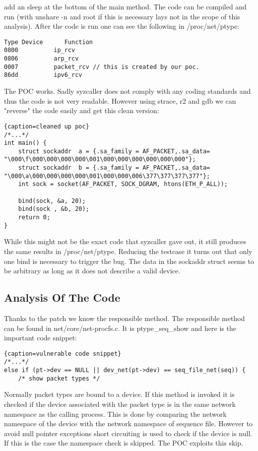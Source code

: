 \documentclass[10pt,twocolumn,a4paper]{article}
\begin{document}
add an sleep at the bottom of the main method. The code can be compiled and run (with unshare -n and root if this
is necessary lays not in the scope of this analysis). After the code is run one can see the following
in /proc/net/ptype:
\begin{lstlisting}
Type Device      Function
0800          ip_rcv
0806          arp_rcv
0007          packet_rcv // this is created by our poc.
86dd          ipv6_rcv
\end{lstlisting}
The POC works. Sadly syzcaller does not comply with any coding standards and thus the code is
not very readable. However using strace, r2\cite{29} and gdb\cite{28} we can "reverse" the code easily and get this
clean version:
\begin{lstlisting}{caption=cleaned up poc}
/*...*/
int main() {
    struct sockaddr  a = {.sa_family = AF_PACKET,.sa_data= "\000\f\000\000\000\000\001\000\000\000\000\000\000"};
    struct sockaddr  b = {.sa_family = AF_PACKET,.sa_data= "\000\a\000\000\000\000\001\000\000\006\377\377\377\377"};
    int sock = socket(AF_PACKET, SOCK_DGRAM, htons(ETH_P_ALL));

    bind(sock, &a, 20);
    bind(sock , &b, 20);
    return 0;
}
\end{lstlisting}
While this might not be the exact code that syzcaller gave out, it still
produces the same results in /proc/net/ptype. Reducing the testcase it turns out that only one bind is necessary to trigger the bug. The data in the sockaddr struct seems to be arbitrary
as long as it does not describe a valid device. 
\subsection{Analysis Of The Code}
Thanks to the patch we know the responsible method.
The responsible method can be found in net/core/net-procfs.c. It is ptype\_seq\_show
and here is the important code snippet:
\begin{lstlisting}{caption=vulnerable code snippet}
/*...*/
else if (pt->dev == NULL || dev_net(pt->dev) == seq_file_net(seq)) {
    /* show packet types */
\end{lstlisting}
Normally packet types are bound to a device. If this method is invoked it is checked if the device
associated with the packet type is in the same network namespace as the calling process. This is
done by comparing the network namespace of the device with the network namespace of sequence file.
However to avoid null pointer exceptions short circuiting is used to check if the device is null. If
this is the case the namespace check is skipped. The POC exploits this skip.
\end{document}
